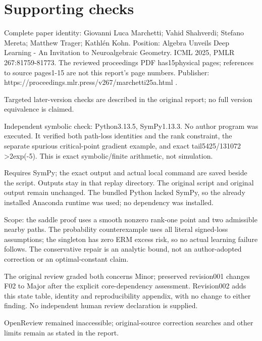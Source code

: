 \documentclass[10pt]{article}
\begin{document}
\section*{Supporting checks}
Complete paper identity: Giovanni Luca Marchetti; Vahid Shahverdi; Stefano Mereta; Matthew Trager; Kathlén Kohn. Position: Algebra Unveils Deep Learning - An Invitation to Neuroalgebraic Geometry. ICML 2025, PMLR 267:81759-81773. The reviewed proceedings PDF has15physical pages; references to source pages1-15 are not this report’s page numbers. Publisher: https://proceedings.mlr.press/v267/marchetti25a.html .\par
Targeted later-version checks are described in the original report; no full version equivalence is claimed.\par
Independent symbolic check: Python3.13.5, SymPy1.13.3. No author program was executed. It verified both path-loss identities and the rank constraint, the separate spurious critical-point gradient example, and exact tail5425/131072 >2exp(-5). This is exact symbolic/finite arithmetic, not simulation.\par
Requires SymPy; the exact output and actual local command are saved beside the script. Outputs stay in that replay directory. The original script and original output remain unchanged. The bundled Python lacked SymPy, so the already installed Anaconda runtime was used; no dependency was installed.\par
Scope: the saddle proof uses a smooth nonzero rank-one point and two admissible nearby paths. The probability counterexample uses all literal signed-loss assumptions; the singleton has zero ERM excess risk, so no actual learning failure follows. The conservative repair is an analytic bound, not an author-adopted correction or an optimal-constant claim.\par
The original review graded both concerns Minor; preserved revision001 changes F02 to Major after the explicit core-dependency assessment. Revision002 adds this state table, identity and reproducibility appendix, with no change to either finding. No independent human review declaration is supplied.\par
OpenReview remained inaccessible; original-source correction searches and other limits remain as stated in the report.\par
\end{document}
